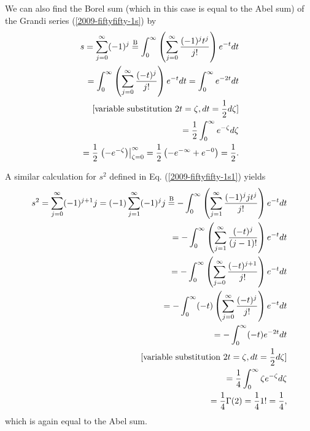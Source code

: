 We can also find the Borel sum (which in this case is equal to the Abel sum)
of the Grandi series (\ref{2009-fiftyfifty-1s})
by
\begin{equation}
\begin{split}
s= \sum_{j=0}^\infty (-1)^j
\stackrel{{\rm B}}{=}
\int_0^\infty \left(\sum_{j=0}^\infty   \frac{(-1)^j t^j}{j!}\right)   e^{-t} dt  \\
=
\int_0^\infty \left(\sum_{j=0}^\infty   \frac{(- t)^j}{j!}\right)   e^{-t} dt
=
\int_0^\infty    e^{-2t} dt  \\
[\textrm{variable substitution } 2t = \zeta, dt = \frac{1}{2} d \zeta ]\\
=
\frac{1}{2}
\int_0^\infty    e^{-\zeta } d\zeta      \\
=
\frac{1}{2}
\left.     \left(-e^{-\zeta }\right) \right|_{\zeta=0}^\infty
=
\frac{1}{2} \left(- e^{-\infty} + e^{-0}\right) = \frac{1}{2}
.
\end{split}
\end{equation}


A similar calculation for $s^2$ defined in Eq.
(\ref{2009-fiftyfifty-1s1})
yields
\begin{equation}
\begin{split}
s^2= \sum_{j=0}^\infty (-1)^{j+1} j = (-1) \sum_{j=1}^\infty (-1)^j j
\stackrel{{\rm B}}{=}
-\int_0^\infty \left(\sum_{j=1}^\infty   \frac{(-1)^j j t^j}{j!}\right)   e^{-t} dt  \\
=
-\int_0^\infty \left(\sum_{j=1}^\infty   \frac{(-t)^j}{(j-1)!}\right)   e^{-t} dt  \\
=
-\int_0^\infty \left(\sum_{j=0}^\infty   \frac{(-t)^{j+1}}{j!}\right)   e^{-t} dt  \\
=
-\int_0^\infty (-t) \left(\sum_{j=0}^\infty   \frac{(-t)^j}{j!}\right)   e^{-t} dt  \\
=
-\int_0^\infty  (-t)  e^{-2t} dt  \\
[\textrm{variable substitution } 2t = \zeta, dt = \frac{1}{2} d \zeta ]\\
=
\frac{1}{4}
\int_0^\infty  \zeta  e^{-\zeta } d\zeta      \\
=
\frac{1}{4}
\Gamma (2)
=
\frac{1}{4} 1! = \frac{1}{4}
,
\end{split}
\end{equation}
which is again equal to the Abel sum.



\begin{center}
{\color{olive}   \Huge
 \floweroneright
}
\end{center}
